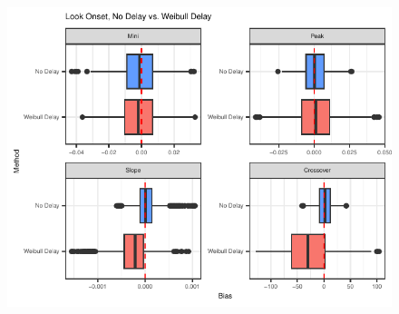 \documentclass{beamer}
\providecommand{\cn}[1]{\textcolor{blue}{#1}}
\begin{document}
\begin{frame}
\begin{figure}[H]
\centering
\includegraphics{compare_bar_plot2.pdf}
\label{fig:par_bias_no_delay}
\end{figure}
\end{frame}

%
%
\end{document}
